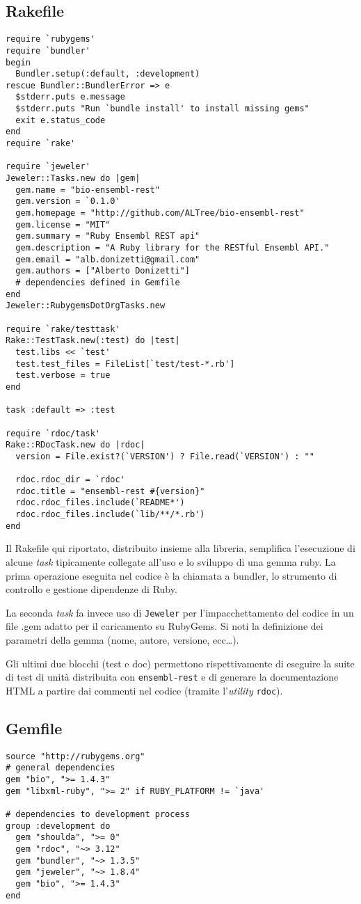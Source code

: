\subsection*{Rakefile}
\begin{verbatim}
require `rubygems'
require `bundler'
begin
  Bundler.setup(:default, :development)
rescue Bundler::BundlerError => e
  $stderr.puts e.message
  $stderr.puts "Run `bundle install' to install missing gems"
  exit e.status_code
end
require `rake'

require `jeweler'
Jeweler::Tasks.new do |gem|
  gem.name = "bio-ensembl-rest"
  gem.version = `0.1.0'
  gem.homepage = "http://github.com/ALTree/bio-ensembl-rest"
  gem.license = "MIT"
  gem.summary = "Ruby Ensembl REST api"
  gem.description = "A Ruby library for the RESTful Ensembl API."
  gem.email = "alb.donizetti@gmail.com"
  gem.authors = ["Alberto Donizetti"]
  # dependencies defined in Gemfile
end
Jeweler::RubygemsDotOrgTasks.new

require `rake/testtask'
Rake::TestTask.new(:test) do |test|
  test.libs << `test'
  test.test_files = FileList[`test/test-*.rb']
  test.verbose = true
end

task :default => :test

require `rdoc/task'
Rake::RDocTask.new do |rdoc|
  version = File.exist?(`VERSION') ? File.read(`VERSION') : ""

  rdoc.rdoc_dir = `rdoc'
  rdoc.title = "ensembl-rest #{version}"
  rdoc.rdoc_files.include(`README*')
  rdoc.rdoc_files.include(`lib/**/*.rb')
end
\end{verbatim}

Il Rakefile qui riportato, distribuito insieme alla libreria, semplifica l'esecuzione di alcune \emph{task} tipicamente collegate all'uso e lo sviluppo di una gemma ruby. La prima operazione eseguita nel codice è la chiamata a bundler, lo strumento di controllo e gestione dipendenze di Ruby.

La seconda \emph{task} fa invece uso di \texttt{Jeweler} per l'impacchettamento del codice in un file .gem adatto per il caricamento su RubyGems. Si noti la definizione dei parametri della gemma (nome, autore, versione, ecc\ldots).

Gli ultimi due blocchi (test e doc) permettono rispettivamente di eseguire la suite di test di unità distribuita con \texttt{ensembl-rest} e di generare la documentazione HTML a partire dai commenti nel codice (tramite l'\emph{utility} \texttt{rdoc}).


\subsection*{Gemfile}
\begin{verbatim}
source "http://rubygems.org"
# general dependencies
gem "bio", ">= 1.4.3"
gem "libxml-ruby", ">= 2" if RUBY_PLATFORM != `java'

# dependencies to development process
group :development do
  gem "shoulda", ">= 0"
  gem "rdoc", "~> 3.12"
  gem "bundler", "~> 1.3.5"
  gem "jeweler", "~> 1.8.4"
  gem "bio", ">= 1.4.3"
end
\end{verbatim}


